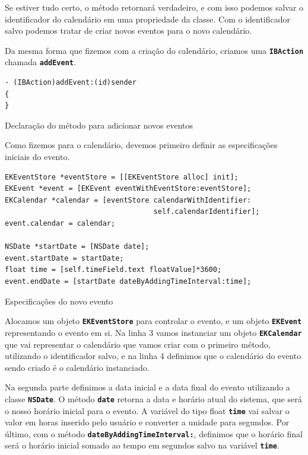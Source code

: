 \documentclass[a4paper,12pt,brazil,doubleside]{book}
\begin{document}
\begin{singlespace}
Se estiver tudo certo, o método retornará verdadeiro, e com isso podemos salvar o identificador do calendário em uma propriedade da classe. Com o identificador salvo podemos tratar de criar novos eventos para o novo calendário.

Da mesma forma que fizemos com a criação do calendário, criamos uma \texttt{\textbf{IBAction}} chamada \texttt{\textbf{addEvent}}.

\begin{listing}[H]
\begin{verbatim}
- (IBAction)addEvent:(id)sender
{
}
\end{verbatim}
\caption{Declaração do método para adicionar novos eventos}
\end{listing}


Como fizemos para o calendário, devemos primeiro definir as especificações iniciais do evento.

\begin{listing}[H]
\begin{verbatim}
EKEventStore *eventStore = [[EKEventStore alloc] init];
EKEvent *event = [EKEvent eventWithEventStore:eventStore];
EKCalendar *calendar = [eventStore calendarWithIdentifier:
                                   self.calendarIdentifier];
event.calendar = calendar;
    
NSDate *startDate = [NSDate date];
event.startDate = startDate;
float time = [self.timeField.text floatValue]*3600;
event.endDate = [startDate dateByAddingTimeInterval:time];
\end{verbatim}
\caption{Especificações do novo evento}
\end{listing}


Alocamos um objeto \texttt{\textbf{EKEventStore}} para controlar o evento, e um objeto \texttt{\textbf{EKEvent}} representando o evento em si. Na linha 3 vamos instanciar um objeto \texttt{\textbf{EKCalendar}} que vai representar o calendário que vamos criar com o primeiro método, utilizando o identificador salvo, e na linha 4 definimos que o calendário do evento sendo criado é o calendário instanciado.

Na segunda parte definimos a data inicial e a data final do evento utilizando a classe \texttt{\textbf{NSDate}}. O método \texttt{\textbf{date}} retorna a data e horário atual do sistema, que será o nosso horário inicial para o evento. A variável do tipo float \texttt{\textbf{time}} vai salvar o valor em horas inserido pelo usuário e converter a unidade para segundos. Por último, com o método \texttt{\textbf{dateByAddingTimeInterval:}}, definimos que o horário final será o horário inicial somado ao tempo em segundos salvo na variável \texttt{\textbf{time}}.


\end{singlespace}
\end{document}

